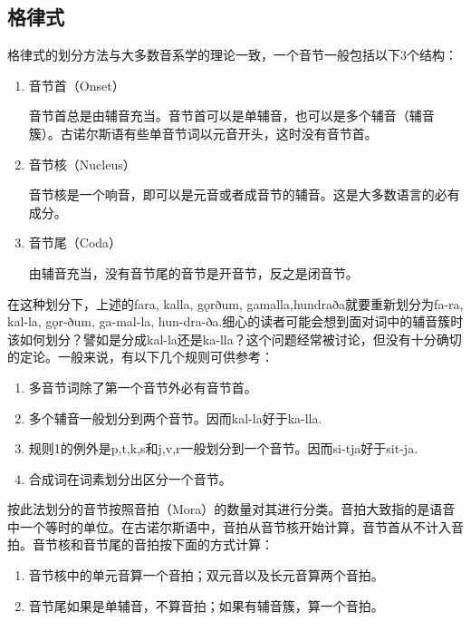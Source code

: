 \subsection*{格律式}

格律式的划分方法与大多数音系学的理论一致，一个音节一般包括以下3个结构：
\begin{enumerate}
    \item 音节首（Onset）

          音节首总是由辅音充当。音节首可以是单辅音，也可以是多个辅音（辅音簇）。古诺尔斯语有些单音节词以元音开头，这时没有音节首。
    \item 音节核（Nucleus）

          音节核是一个响音，即可以是元音或者成音节的辅音。这是大多数语言的必有成分。
    \item 音节尾（Coda）

          由辅音充当，没有音节尾的音节是开音节，反之是闭音节。

\end{enumerate}

在这种划分下，上述的fara, kalla, gǫrðum, gamalla,hundraða就要重新划分为fa-ra, kal-la, gǫr-ðum, ga-mal-la, hun-dra-ða.细心的读者可能会想到面对词中的辅音簇时该如何划分？譬如是分成kal-la还是ka-lla？这个问题经常被讨论，但没有十分确切的定论。一般来说，有以下几个规则可供参考：

\begin{info}
    \begin{enumerate}
        \item 多音节词除了第一个音节外必有音节首。
        \item 多个辅音一般划分到两个音节。因而kal-la好于ka-lla.
        \item 规则1的例外是p,t,k,s和j,v,r一般划分到一个音节。因而si-tja好于sit-ja.
        \item 合成词在词素划分出区分一个音节。
    \end{enumerate}
\end{info}

按此法划分的音节按照音拍（Mora）的数量对其进行分类。音拍大致指的是语音中一个等时的单位。在古诺尔斯语中，音拍从音节核开始计算，音节首从不计入音拍。音节核和音节尾的音拍按下面的方式计算：

\begin{info}
    \begin{enumerate}
        \item 音节核中的单元音算一个音拍；双元音以及长元音算两个音拍。
        \item 音节尾如果是单辅音，不算音拍；如果有辅音簇，算一个音拍。    
    \end{enumerate}
\end{info}

